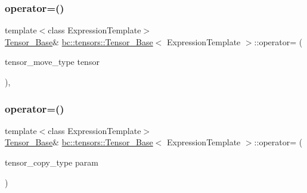 \mbox{\label{classbc_1_1tensors_1_1Tensor__Base_a63495fc3dadef768af28ba59e949cba3}} 
\subsubsection{\texorpdfstring{operator=()}{operator=()}\hspace{0.1cm}{\footnotesize\ttfamily [3/4]}}
{\footnotesize\ttfamily template$<$class Expression\+Template$>$ \\
\hyperlink{classbc_1_1tensors_1_1Tensor__Base}{Tensor\+\_\+\+Base}\& \hyperlink{classbc_1_1tensors_1_1Tensor__Base}{bc\+::tensors\+::\+Tensor\+\_\+\+Base}$<$ Expression\+Template $>$\+::operator= (\begin{DoxyParamCaption}\item[{tensor\+\_\+move\+\_\+type}]{tensor }\end{DoxyParamCaption})\hspace{0.3cm}{\ttfamily [inline]}, {\ttfamily [noexcept]}}

\mbox{\label{classbc_1_1tensors_1_1Tensor__Base_a702f38f7ad53a727ef2a20ae30ca0ba0}} 
\subsubsection{\texorpdfstring{operator=()}{operator=()}\hspace{0.1cm}{\footnotesize\ttfamily [4/4]}}
{\footnotesize\ttfamily template$<$class Expression\+Template$>$ \\
\hyperlink{classbc_1_1tensors_1_1Tensor__Base}{Tensor\+\_\+\+Base}\& \hyperlink{classbc_1_1tensors_1_1Tensor__Base}{bc\+::tensors\+::\+Tensor\+\_\+\+Base}$<$ Expression\+Template $>$\+::operator= (\begin{DoxyParamCaption}\item[{tensor\+\_\+copy\+\_\+type}]{param }\end{DoxyParamCaption})\hspace{0.3cm}{\ttfamily [inline]}}

